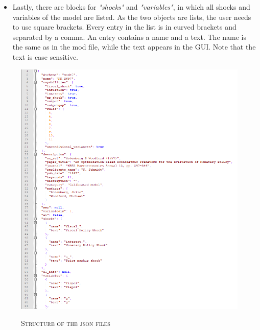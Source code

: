 \begin{itemize}
	\item Lastly, there are blocks for \textit{"shocks"} and \textit{"variables"}, in which all shocks and variables of the model are listed. As the two objects are lists, the user needs to use square brackets. Every entry in the list is in curved brackets and separated by a comma. An entry contains a name and a text. The name is the same as in the mod file, while the text appears in the GUI. Note that the text is case sensitive.
\end{itemize}

\begin{figure}[H]
	\centering
	\caption{\textsc{Structure of the json files}}
	\vspace{0.2cm}
	\includegraphics[width=15cm,keepaspectratio]{json1.png}\\
	\label{img:jsonstructure}
\end{figure}

